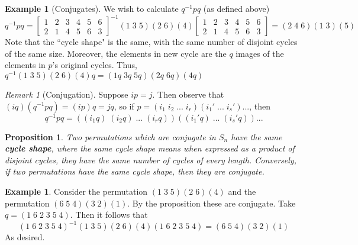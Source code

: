 \documentclass[12pt]{article}
\newtheorem{prop}[thm]{Proposition}
\theoremstyle{definition}
\newtheorem{eg}[thm]{Example}
\theoremstyle{remark}
\newtheorem{rmk}[thm]{Remark}
\numberwithin{equation}{section}
\newcommand\B[1]{\textbf{ #1}}
\begin{document}
\vspace{15pt}

\begin{eg}[Conjugates]
        We wish to calculate $q^{-1}pq$ (as defined above) \begin{equation}
                q^{-1}pq = \begin{bmatrix} 1 & 2 & 3 & 4 & 5 & 6 \\ 2 & 1 & 4 & 5 & 6 & 3 \end{bmatrix}^{-1}(1\;3\;5)(2\;6)(4)\begin{bmatrix} 1 & 2 & 3 & 4 & 5 & 6 \\ 2 & 1 & 4 & 5 & 6 & 3 \end{bmatrix} = (2\;4\;6)(1\;3)(5)
        \end{equation}
        Note that the ``cycle shape" is the same, with the same number of disjoint cycles of the same size. Moreover, the elements in new cycle are the $q$ images of the elements in $p$'s original cycles. Thus, $q^{-1}(1\;3\;5)(2\;6)(4)q = (1q\;3q\;5q)(2q\;6q)(4q)$
\end{eg}

\vspace{15pt}

\begin{rmk}[Conjugation]
        Suppose $ip = j$. Then observe that $(iq)(q^{-1}pq) = (ip)q = jq$, so if $p = (i_1\;i_2\;...\;i_r)(i_1'\;...\;i_s')...$, then \begin{equation}
                q^{-1}pq = ((i_1q)\;(i_2q)\;...\;(i_rq))((i_1'q)\;...\;(i_s'q))...
        \end{equation}
\end{rmk}


\vspace{15pt}


\begin{prop}
        Two permutations which are conjugate in $S_n$ have the same \B{cycle shape}, where the same cycle shape means when expressed as a product of disjoint cycles, they have the same number of cycles of every length. Conversely, if two permutations have the same cycle shape, then they are conjugate.
\end{prop}


\vspace{15pt}


\begin{eg}
        Consider the permutation $(1\;3\;5)(2\;6)(4)$ and the permutation $(6\;5\;4)(3\;2)(1)$. By the proposition these are conjugate. Take $q = (1\;6\;2\;3\;5\;4)$. Then it follows that \begin{equation}
                (1\;6\;2\;3\;5\;4)^{-1}(1\;3\;5)(2\;6)(4)(1\;6\;2\;3\;5\;4) = (6\;5\;4)(3\;2)(1)
        \end{equation}
        As desired.
\end{eg}
\end{document}
